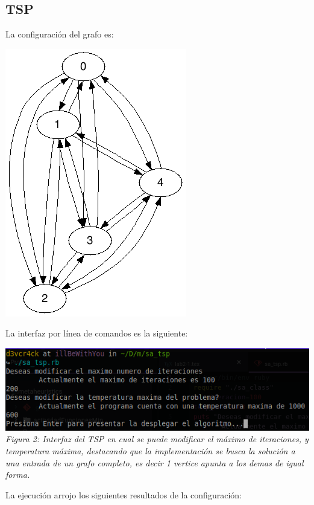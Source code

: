 \documentclass[10pt]{article}
\begin{document}
\subsection{TSP}
La configuración del grafo es:
\begin{center}
  \includegraphics[scale=0.5]{imgs/grafo.png}
\end{center}
La interfaz por línea de comandos es la siguiente:
\begin{center}
  \includegraphics[scale=0.5]{imgs/int-tsp.png}\\
  \textit{Figura 2: Interfaz del TSP en cual se puede modificar el máximo de iteraciones, y temperatura máxima, destacando que la implementación se busca la solución a una entrada de un grafo completo, es decir 1 vertice apunta a los demas de igual forma.}
\end{center}
La ejecución arrojo los siguientes resultados de la configuración:
\end{document}
